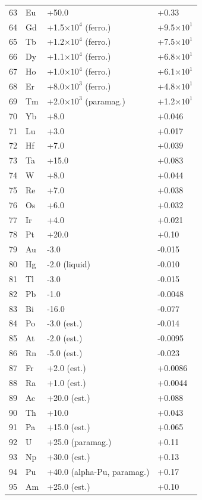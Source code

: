 \documentclass[12pt,a4paper]{article}
\begin{document}
\begin{longtable}{p{0.6cm}p{1.2cm}p{2.5cm}p{2.5cm}}
		63 & Eu & +50.0 & +0.33 \\
		64 & Gd & +1.5\(\times10^4\) (ferro.) & +9.5\(\times10^1\) \\
		65 & Tb & +1.2\(\times10^4\) (ferro.) & +7.5\(\times10^1\) \\
		66 & Dy & +1.1\(\times10^4\) (ferro.) & +6.8\(\times10^1\) \\
		67 & Ho & +1.0\(\times10^4\) (ferro.) & +6.1\(\times10^1\) \\
		68 & Er & +8.0\(\times10^3\) (ferro.) & +4.8\(\times10^1\) \\
		69 & Tm & +2.0\(\times10^3\) (paramag.) & +1.2\(\times10^1\) \\
		70 & Yb & +8.0 & +0.046 \\
		71 & Lu & +3.0 & +0.017 \\
		72 & Hf & +7.0 & +0.039 \\
		73 & Ta & +15.0 & +0.083 \\
		74 & W  & +8.0 & +0.044 \\
		75 & Re & +7.0 & +0.038 \\
		76 & Os & +6.0 & +0.032 \\
		77 & Ir & +4.0 & +0.021 \\
		78 & Pt & +20.0 & +0.10 \\
		79 & Au & -3.0 & -0.015 \\
		80 & Hg & -2.0 (liquid) & -0.010 \\
		81 & Tl & -3.0 & -0.015 \\
		82 & Pb & -1.0 & -0.0048 \\
		83 & Bi & -16.0 & -0.077 \\
		84 & Po & -3.0 (est.) & -0.014 \\
		85 & At & -2.0 (est.) & -0.0095 \\
		86 & Rn & -5.0 (est.) & -0.023 \\
		87 & Fr & +2.0 (est.) & +0.0086 \\
		88 & Ra & +1.0 (est.) & +0.0044 \\
		89 & Ac & +20.0 (est.) & +0.088 \\
		90 & Th & +10.0 & +0.043 \\
		91 & Pa & +15.0 (est.) & +0.065 \\
		92 & U  & +25.0 (paramag.) & +0.11 \\
		93 & Np & +30.0 (est.) & +0.13 \\
		94 & Pu & +40.0 (alpha-Pu, paramag.) & +0.17 \\
		95 & Am & +25.0 (est.) & +0.10 \\

\end{longtable}
\end{document}
